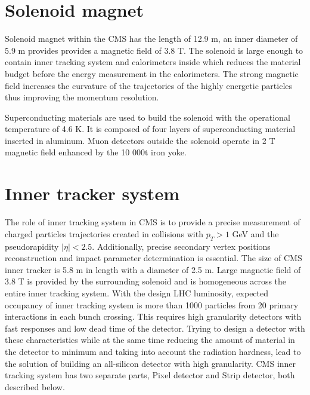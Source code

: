 \section{Solenoid magnet}

Solenoid magnet within the CMS has the length of 12.9 m, an inner diameter of 5.9 m provides provides a magnetic field of 3.8 T. The solenoid is large enough to contain inner tracking system and calorimeters inside which reduces the material budget before the energy measurement in the calorimeters. The strong magnetic field increases the curvature of the trajectories of the highly energetic particles thus improving the momentum resolution.
\par Superconducting materials are used to build the solenoid with the operational temperature of 4.6 K. It is composed of four layers of superconducting material inserted in aluminum. Muon detectors outside the solenoid operate in 2 T magnetic field enhanced by the 10 000t iron yoke.  


\section{Inner tracker system}

The role of inner tracking system in CMS is to provide a precise measurement of charged particles trajectories created in collisions with $p_T>1$ GeV and the pseudorapidity $|\eta|<2.5$. Additionally, precise secondary vertex positions reconstruction and impact parameter determination is essential. The size of CMS inner tracker is 5.8 m in length with a diameter of 2.5 m. Large magnetic field of 3.8 T is provided by the surrounding solenoid and is homogeneous across the entire inner tracking system. With the design LHC luminosity, expected occupancy of inner tracking system is more than 1000 particles from 20 primary interactions in each bunch crossing. This requires high granularity detectors with fast responses and low dead time of the detector. Trying to design a detector with these characteristics while at the same time reducing the amount of material in the detector to minimum and taking into account the radiation hardness, lead to the solution of building an all-silicon detector with high granularity. CMS inner tracking system has two separate parts, Pixel detector and Strip detector, both described below.    



